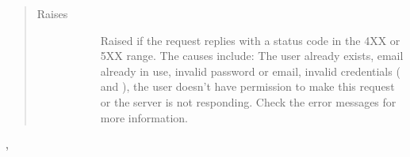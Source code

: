 \documentclass[letterpaper,10pt,english]{sphinxmanual}
\begin{document}
\begin{fulllineitems}
\begin{quote}
\begin{description}
\begin{description}
\end{description}

\item[{Raises}] \leavevmode\begin{description}
\item[{}] \leavevmode
Raised if the request replies with a status code in the 4XX or 5XX range.
The causes include: The user already exists, email already in use, invalid
password or email, invalid credentials ( and ), the user
doesn’t have permission to make this request or the server is not 
responding. Check the error messages for more information.

\end{description}

\end{description}\end{quote}




, {\hyperref[\detokenize{grafanaAPI:grafanaAPI.removeFromOrg}]{}}



\end{fulllineitems}

\end{document}
